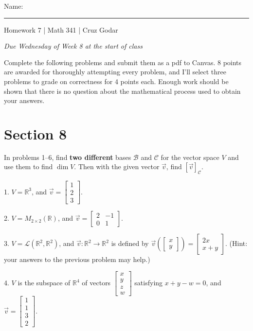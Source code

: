 \documentclass{article}
\begin{document}
\Large Name: \rule{2in}{0.15mm} \hfill Homework 7 | Math 341 | Cruz Godar \vspace{4pt} \normalsize

\textit{Due Wednesday of Week 8 at the start of class}

Complete the following problems and submit them as a pdf to Canvas. 8 points are awarded for thoroughly attempting every problem, and I'll select three problems to grade on correctness for 4 points each. Enough work should be shown that there is no question about the mathematical process used to obtain your answers.

\section{Section 8}

In problems 1--6, find \textbf{two different} bases $\mathcal{B}$ and $\mathcal{C}$ for the vector space $V$ and use them to find $\dim V$. Then with the given vector $\vec{v}$, find $[\vec{v}]_\mathcal{C}$.

1. $V = \mathbb{R}^3$, and $\vec{v} = \left[\begin{array}{c} 1 \\ 2 \\ 3 \end{array}\right]$.

2. $V = M_{2 \times 2}(\mathbb{R})$, and $\vec{v} = \left[\begin{array}{cc} 2& -1 \\ 0& 1 \end{array}\right]$.

3. $V = \mathcal{L}(\mathbb{R}^2, \mathbb{R}^2)$, and $\vec{v}:\mathbb{R}^2 \to \mathbb{R}^2$ is defined by $\vec{v}\left( \left[\begin{array}{c} x \\ y \end{array}\right] \right) = \left[\begin{array}{c} 2x \\ x + y \end{array}\right]$. (Hint: your answers to the previous problem may help.)

4. $V$ is the subspace of $\mathbb{R}^4$ of vectors $\left[\begin{array}{c} x \\ y \\ z \\ w \end{array}\right]$ satisfying $x + y - w = 0$, and $\vec{v} = \left[\begin{array}{c} 1 \\ 1 \\ 3 \\ 2 \end{array}\right]$.
\end{document}
